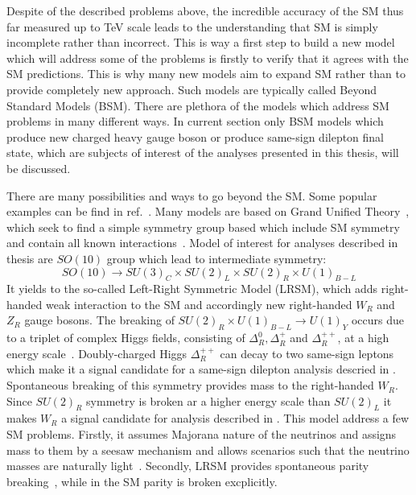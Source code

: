 Despite of the described problems above, the incredible accuracy of the SM thus far measured up to TeV scale leads to the understanding that SM 
is simply incomplete rather than incorrect. 
This is way a first step to build a new model which will address some of the problems is firstly to verify that it agrees with the SM predictions. 
This is why many new models aim to expand SM rather than to provide completely new approach. Such models are typically called Beyond Standard Models (BSM).
There are plethora of the models which address SM problems in many different ways. In current section only BSM models which produce new charged heavy gauge boson or produce same-sign dilepton final state, which are subjects of interest of the analyses presented in this thesis, will be discussed.

There are many possibilities and ways to go beyond the SM. 
Some popular examples can be find in ref.~\cite{Ellis:2011jb}.
Many models are based on Grand Unified Theory~\cite{GUT_bigPaper},
which seek to find a simple symmetry group based which include SM symmetry
and contain all known interactions~\cite{Langacker:1984dc,Cvetic:1995zs}.
Model of interest for analyses described in thesis are $SO(10)$ group
which lead to intermediate symmetry:
\begin{equation}
SO(10) \to SU(3)_C \times SU(2)_L \times SU(2)_R \times U(1)_{B-L}
\end{equation}
It yields to the so-called Left-Right Symmetric Model (LRSM), which adds
right-handed weak interaction to the SM and accordingly new right-handed $W_R$ and $Z_R$ gauge bosons.
The breaking of $SU(2)_R \times U(1)_{B-L} \to U(1)_Y$ occurs due to a triplet of complex Higgs fields, consisting of $\Delta^0_R, \Delta^+_R$ and $\Delta^{++}_R$, at a high energy scale~\cite{Azuelos:2004mwa}.
Doubly-charged Higgs $\Delta^{++}_R$ can decay to two same-sign leptons which make it a signal candidate for a same-sign dilepton analysis descried in . Spontaneous breaking of this symmetry provides mass to the right-handed $W_R$.
Since $SU(2)_R$ symmetry is broken ar a higher energy scale than $SU(2)_L$ it makes
$W_R$ a signal candidate for analysis described in .
This model address a few SM problems. Firstly, it assumes Majorana nature of the neutrinos and assigns mass to them by a seesaw mechanism and allows scenarios such that the neutrino masses are naturally light~\cite{Mohapatra:1979ia}. 
Secondly, LRSM provides spontaneous parity breaking~\cite{Grimus:1993fx}, while in the SM parity is broken excplicitly.

